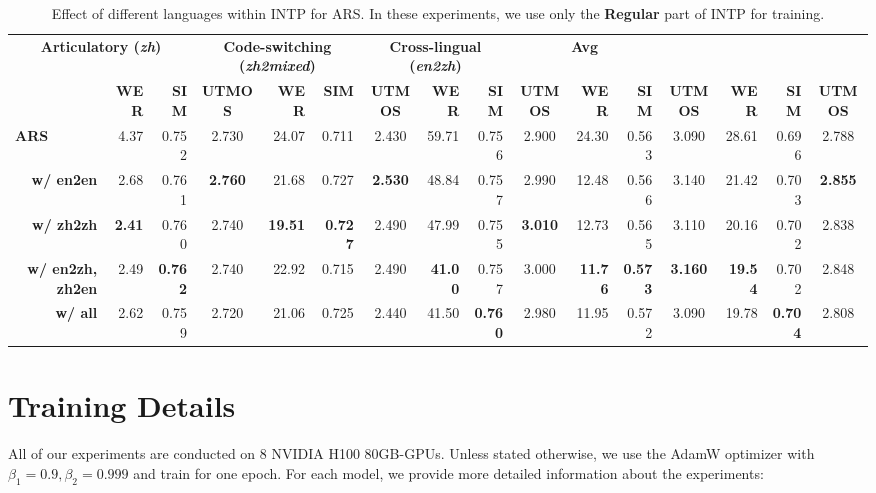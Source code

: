 \documentclass[11pt]{article}
\begin{document}
\begin{table}[t]
\begin{center}
{\begin{threeparttable}
\begin{tabular}{c||rrc|rrc|rrc|rrc||rrc}
    \multicolumn{3}{c|}{\textbf{Articulatory (\textit{zh})}} &
    \multicolumn{3}{c|}{\textbf{Code-switching (\textit{zh2mixed})}} &
    \multicolumn{3}{c||}{\textbf{Cross-lingual (\textit{en2zh})}} &
    \multicolumn{3}{c}{\textbf{Avg}} \\
    \cmidrule(lr){2-13} \cmidrule(lr){14-16}
     & \textbf{WER} & \textbf{SIM} & \textbf{UTMOS} & \textbf{WER} & \textbf{SIM} & \textbf{UTMOS} & \textbf{WER} & \textbf{SIM} & \textbf{UTMOS} & \textbf{WER} & \textbf{SIM} & \textbf{UTMOS} & \textbf{WER} & \textbf{SIM} & \textbf{UTMOS} \\
    \midrule 
    \multicolumn{1}{l||}{\textbf{ARS}~\cite{maskgct}} & 4.37 & 0.752 & 2.730 & 24.07 & 0.711 & 2.430 & 59.71 & 0.756 & 2.900 & 24.30 & 0.563 & 3.090 & 28.61 & 0.696 & 2.788 \\
    \cmidrule(lr){1-16}
    \multicolumn{1}{r||}{\textbf{w/ en2en}} & 2.68 & 0.761 & \textbf{2.760} & 21.68 & 0.727 & \textbf{2.530} & 48.84 & 0.757 & 2.990 & 12.48 & 0.566 & 3.140 & 21.42 & 0.703 & \textbf{2.855} \\
    \multicolumn{1}{r||}{\textbf{w/ zh2zh}} & \textbf{2.41} & 0.760 & 2.740 & \textbf{19.51} & \textbf{0.727} & 2.490 & 47.99 & 0.755 & \textbf{3.010} & 12.73 & 0.565 & 3.110 & 20.16 & 0.702 & 2.838 \\
    \multicolumn{1}{r||}{\textbf{w/ en2zh, zh2en}} & 2.49 & \textbf{0.762} & 2.740 & 22.92 & 0.715 & 2.490 & \textbf{41.00} & 0.757 & 3.000 & \textbf{11.76} & \textbf{0.573} & \textbf{3.160} & \textbf{19.54} & 0.702 & 2.848 \\
    \multicolumn{1}{r||}{\textbf{w/ all}} & 2.62 & 0.759 & 2.720 & 21.06 & 0.725 & 2.440 & 41.50 & \textbf{0.760} & 2.980 & 11.95 & 0.572 & 3.090 & 19.78 & \textbf{0.704} & 2.808 \\
    \bottomrule
    \end{tabular}
\end{threeparttable}
}
\caption{Effect of different languages within INTP for ARS. In these experiments, we use only the \textbf{Regular} part of INTP for training.}
\label{tab:expt-effect-lang}
\end{center}
\end{table}

\section{Training Details}\label{sec:appendix-train-detail}

All of our experiments are conducted on 8 NVIDIA H100 80GB-GPUs. Unless stated otherwise, we use the AdamW optimizer with $\beta_1 = 0.9, \beta_2 = 0.999$ and train for one epoch. For each model, we provide more detailed information about the experiments:
\end{document}
